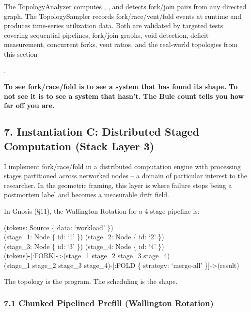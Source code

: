 \documentclass[
]{article}
\begin{document}
The TopologyAnalyzer computes , , and detects fork/join pairs from any
directed graph. The TopologySampler records fork/race/vent/fold events
at runtime and produces time-series utilization data. Both are validated
by targeted tests covering sequential pipelines, fork/join graphs, void
detection, deficit measurement, concurrent forks, vent ratios, and the
real-world topologies from this section

.

\textbf{To see fork/race/fold is to see a system that has found its
shape. To not see it is to see a system that hasn't. The Bule count
tells you how far off you are.}

\subsection{\texorpdfstring{\textbf{7. Instantiation C: Distributed
Staged Computation (Stack Layer
3)}}{7. Instantiation C: Distributed Staged Computation (Stack Layer 3)}}\label{instantiation-c-distributed-staged-computation-stack-layer-3}

I implement fork/race/fold in a distributed computation engine with
processing stages partitioned across networked nodes -- a domain of
particular interest to the researcher. In the geometric framing, this
layer is where failure stops being a postmortem label and becomes a
measurable drift field.

In Gnosis (§11), the Wallington Rotation for a 4-stage pipeline is:

(tokens: Source \{ data: `workload' \})\\
(stage\_1: Node \{ id: `1' \}) (stage\_2: Node \{ id: `2' \})\\
(stage\_3: Node \{ id: `3' \}) (stage\_4: Node \{ id: `4' \})\\
(tokens)-{[}:FORK{]}-\textgreater(stage\_1 \textbar{} stage\_2
\textbar{} stage\_3 \textbar{} stage\_4)\\
(stage\_1 \textbar{} stage\_2 \textbar{} stage\_3 \textbar{}
stage\_4)-{[}:FOLD \{ strategy: `merge-all' \}{]}-\textgreater(result)

The topology is the program. The scheduling is the shape.

\subsubsection{\texorpdfstring{\textbf{7.1 Chunked Pipelined Prefill
(Wallington
Rotation)}}{7.1 Chunked Pipelined Prefill (Wallington Rotation)}}\label{chunked-pipelined-prefill-wallington-rotation}
\end{document}
